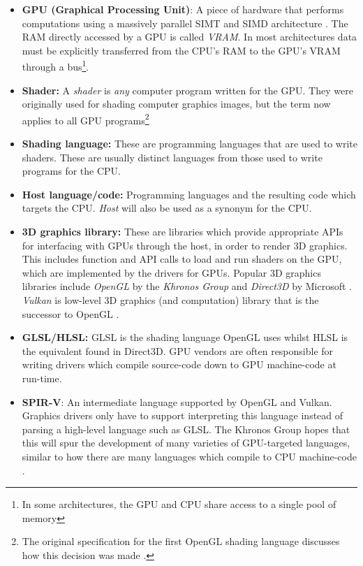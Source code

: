 \documentclass[a4paper,12pt,twoside,openright]{report}
\begin{document}
\begin{itemize}

    \item \textbf{GPU (Graphical Processing Unit)}: A piece of hardware that
    performs computations using a massively parallel SIMT and SIMD architecture
    \cite{GPUSIMTSIMD}. The RAM directly accessed by a GPU is called \textit{VRAM}. In
    most architectures data must be explicitly transferred from the CPU's RAM
    to the GPU's VRAM through a bus\footnote{In some architectures, the GPU and
    CPU share access to a single pool of memory\cite{PS4SpecAnalysis}}.

    \item \textbf{Shader:} A \textit{shader} is \textit{any} computer
    program written for the GPU. They were originally used for shading computer
    graphics images, but the term now applies to all GPU programs\footnote{The
    original specification for the first OpenGL shading language discusses how
    this decision was made \cite{GLSL_1_10}.}

    \item \textbf{Shading language:} These are programming languages that are
    used to write shaders. These are usually distinct languages from those used
    to write programs for the CPU.

    \item \textbf{Host language/code:} Programming languages and the resulting
    code which targets the CPU. \textit{Host} will also be used as a synonym
    for the CPU.

    \item \textbf{3D graphics library:} These are libraries which provide
    appropriate APIs for interfacing with GPUs through the host, in order to
    render 3D graphics. This includes function and API calls to load and run
    shaders on the GPU, which are implemented by the drivers for GPUs. Popular
    3D graphics libraries include \textit{OpenGL} by the \textit{Khronos Group}
    and \textit{Direct3D} by Microsoft \cite{OpenGL} \cite{Direct3D}.
    \textit{Vulkan} is low-level 3D graphics (and computation) library that is
    the successor to OpenGL \cite{Vulkan}.

    \item \textbf{GLSL/HLSL:} GLSL is the shading language OpenGL uses whilst
    HLSL is the equivalent found in Direct3D. GPU vendors are often responsible
    for writing drivers which compile source-code down to GPU machine-code at
    run-time. %

    \item \textbf{SPIR-V}: An intermediate language supported by OpenGL and
    Vulkan. Graphics drivers only have to support interpreting this language
    instead of parsing a high-level language such as GLSL. The Khronos Group
    hopes that this will spur the development of many varieties of GPU-targeted
    languages, similar to how there are many languages which compile to CPU
    machine-code \cite{SPIRV}. %

\end{itemize}
\end{document}
